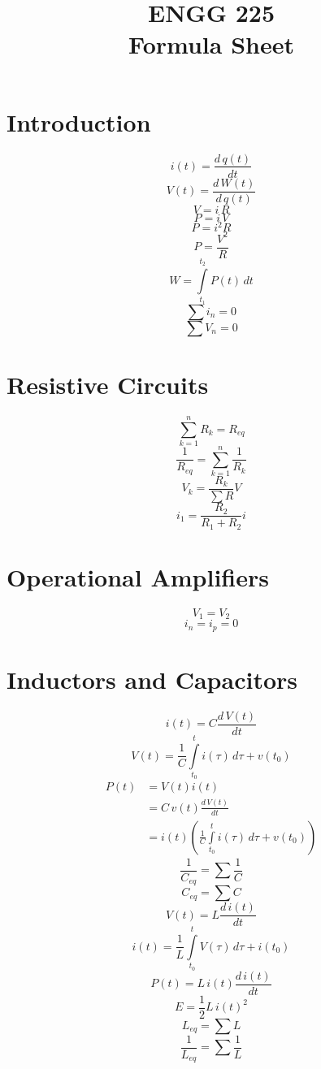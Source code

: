 \documentclass[14pt]{article}
\title{ENGG 225\\ Formula Sheet}
\date{}
\author{}
\begin{document}
    \maketitle
    \section{Introduction}
    \begin{multicols}{2}
        $$i(t)=\frac{d\, q(t)}{dt}$$
        $$V(t)=\frac{d\,W(t)}{d\, q(t)}$$
        $$V=i\, R$$
        $$P=i\, V$$
        $$P=i^2R$$
        $$P=\frac{V^2}{R}$$
        $$W=\int\limits_{t_1}^{t_2}P(t)\,dt$$
        $$\sum i_n=0$$
        $$\sum V_n=0$$
    \end{multicols}
    \section{Resistive Circuits}
    \begin{multicols}{2}
        $$\sum\limits^n_{k=1}R_k=R_{eq}$$
        $$\frac{1}{R_{eq}}=\sum\limits_{k=1}^n\frac{1}{R_k}$$
        $$V_k=\frac{R_k}{\sum R}V$$
        $$i_1=\frac{R_2}{R_1+R_2}i$$

    \end{multicols}
    \section{Operational Amplifiers}
    \begin{multicols}{2}
        $$V_1=V_2$$
        $$i_n=i_p=0$$
    \end{multicols}
    \section{Inductors and Capacitors}
    \begin{multicols}{2}
        $$i(t)=C\frac{d\, V(t)}{dt}$$
        $$V(t)=\frac{1}{C}\int\limits_{t_0}^ti(\tau)\, d\tau+v(t_0)$$
        \begin{align*}
            P(t)&=V(t)i(t)\\
            &=C\,v(t)\frac{d\, V(t)}{dt}\\
            &=i(t)\left(\frac{1}{C}\int\limits_{t_0}^ti(\tau)\, d\tau+v(t_0)\right)
        \end{align*}
        $$\frac{1}{C_{eq}}=\sum\frac{1}{C}$$
        $$C_{eq}=\sum C$$
        $$V(t)=L\frac{d\, i(t)}{dt}$$
        $$i(t)=\frac{1}{L}\int\limits_{t_0}^tV(\tau)\,d\tau+i(t_0)$$
        $$P(t)=L\,i(t)\frac{d\, i(t)}{dt}$$
        $$E=\frac{1}{2}L\, i(t)^2$$
        $$L_{eq}=\sum L$$
        $$\frac{1}{L_{eq}}=\sum\frac{1}{L}$$
    \end{multicols}
\end{document}
